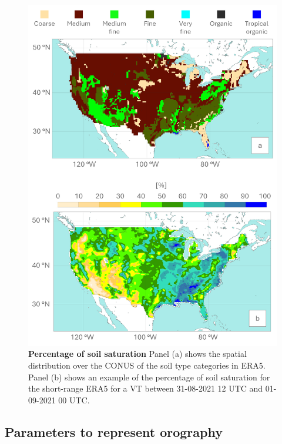 \begin{figure}[htbp]
\centering
\includegraphics[width=\textwidth]{perc_soil_saturation.png}
\caption{\textbf{Percentage of soil saturation} Panel (a) shows the spatial distribution over the CONUS of the soil type categories in ERA5. Panel (b) shows an example of the percentage of soil saturation for the short-range ERA5 for a VT between 31-08-2021 12 UTC and 01-09-2021 00 UTC.}
\label{fig:perc_soil_saturation}
\end{figure}


\subsection{Parameters to represent orography}

